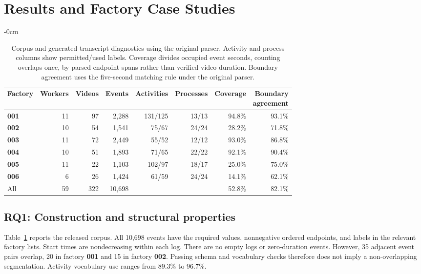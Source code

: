 \section{Results and Factory Case Studies}
\label{sec:results}
\begin{table}[!b]\begin{adjustwidth}{-\extralength}{0cm}\centering
\caption{Corpus and generated transcript diagnostics using the original parser. Activity and process columns show permitted/used labels. Coverage divides occupied event seconds, counting overlaps once, by parsed endpoint spans rather than verified video duration. Boundary agreement uses the five-second matching rule under the original parser.}
\label{tab:corpus}\small\setlength{\tabcolsep}{4pt}
\begin{tabular}{@{}lrrrrrrr@{}}\toprule
Factory & Workers & Videos & Events & Activities & Processes & Coverage & \shortstack{Boundary\\agreement} \\\midrule
\textbf{001} & 11 & 97 & 2{,}288 & 131/125 & 13/13 & 94.8\% & 93.1\% \\
\textbf{002} & 10 & 54 & 1{,}541 & 75/67 & 24/24 & 28.2\% & 71.8\% \\
\textbf{003} & 11 & 72 & 2{,}449 & 55/52 & 12/12 & 93.0\% & 86.8\% \\
\textbf{004} & 10 & 51 & 1{,}893 & 71/65 & 22/22 & 92.1\% & 90.4\% \\
\textbf{005} & 11 & 22 & 1{,}103 & 102/97 & 18/17 & 25.0\% & 75.0\% \\
\textbf{006} & 6 & 26 & 1{,}424 & 61/59 & 24/24 & 14.1\% & 62.1\% \\\midrule
All & 59 & 322 & 10{,}698 & & & 52.8\% & 82.1\% \\
\bottomrule\end{tabular}\end{adjustwidth}\end{table}

\subsection{\textbf{RQ1}: Construction and structural properties}
\label{sec:structure}
Table~\ref{tab:corpus} reports the released corpus. All 10{,}698 events have the required values, nonnegative ordered endpoints, and labels in the relevant factory lists. Start times are nondecreasing within each log. There are no empty logs or zero-duration events. However, 35 adjacent event pairs overlap, 20 in factory \textbf{001} and 15 in factory \textbf{002}. Passing schema and vocabulary checks therefore does not imply a non-overlapping segmentation. Activity vocabulary use ranges from 89.3\% to 96.7\%.

